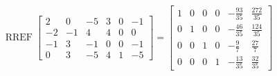 \begin{exerciseAnswer} 


\[\operatorname{RREF} \left[\begin{array}{cccccc}
2 & 0 & -5 & 3 & 0 & -1 \\
-2 & -1 & 4 & 4 & 0 & 0 \\
-1 & 3 & -1 & 0 & 0 & -1 \\
0 & 3 & -5 & 4 & 1 & -5
\end{array}\right] = \left[\begin{array}{cccccc}
1 & 0 & 0 & 0 & -\frac{93}{35} & \frac{272}{35} \\
0 & 1 & 0 & 0 & -\frac{46}{35} & \frac{124}{35} \\
0 & 0 & 1 & 0 & -\frac{9}{7} & \frac{27}{7} \\
0 & 0 & 0 & 1 & -\frac{13}{35} & \frac{32}{35}
\end{array}\right] \]



\end{exerciseAnswer}
